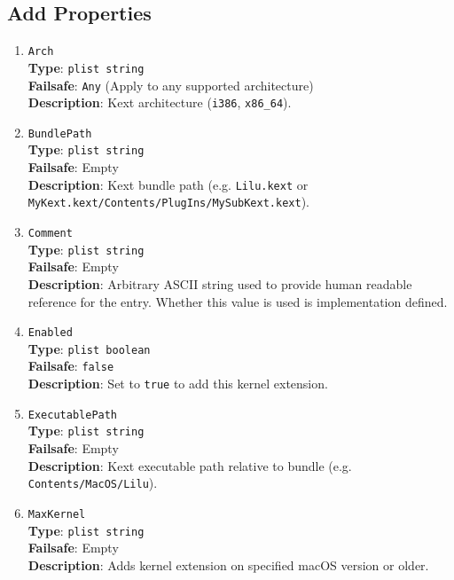 \documentclass[]{article}
\begin{document}
\subsection{Add Properties}\label{kernelpropsadd}

\begin{enumerate}
\item
  \texttt{Arch}\\
  \textbf{Type}: \texttt{plist\ string}\\
  \textbf{Failsafe}: \texttt{Any} (Apply to any supported architecture)\\
  \textbf{Description}: Kext architecture (\texttt{i386}, \texttt{x86\_64}).

\item
  \texttt{BundlePath}\\
  \textbf{Type}: \texttt{plist\ string}\\
  \textbf{Failsafe}: Empty\\
  \textbf{Description}: Kext bundle path (e.g. \texttt{Lilu.kext}
  or \texttt{MyKext.kext/Contents/PlugIns/MySubKext.kext}).

\item
  \texttt{Comment}\\
  \textbf{Type}: \texttt{plist\ string}\\
  \textbf{Failsafe}: Empty\\
  \textbf{Description}: Arbitrary ASCII string used to provide human readable
  reference for the entry. Whether this value is used is implementation defined.

\item
  \texttt{Enabled}\\
  \textbf{Type}: \texttt{plist\ boolean}\\
  \textbf{Failsafe}: \texttt{false}\\
  \textbf{Description}: Set to \texttt{true} to add this kernel extension.

\item
  \texttt{ExecutablePath}\\
  \textbf{Type}: \texttt{plist\ string}\\
  \textbf{Failsafe}: Empty\\
  \textbf{Description}: Kext executable path relative to bundle
  (e.g. \texttt{Contents/MacOS/Lilu}).

\item
  \texttt{MaxKernel}\\
  \textbf{Type}: \texttt{plist\ string}\\
  \textbf{Failsafe}: Empty\\
  \textbf{Description}: Adds kernel extension on specified macOS version or older.


\end{enumerate}
\end{document}
